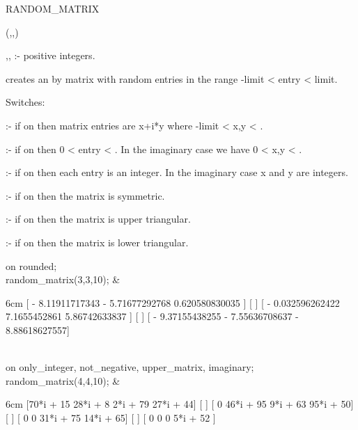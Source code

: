 \begin{Operator}[randommatrix]{RANDOM_MATRIX}

\begin{Syntax}
(,,)
\end{Syntax}
 
,, :- positive integers. 

 creates an  by  matrix with random
entries in the range -limit < entry < limit.


Switches:

    :- if on then matrix entries are x+i*y where -limit < x,y
                 < . 

 :- if on then 0 < entry < . In the imaginary 
                 case we have 0 < x,y < . 

 :- if on then each entry is an integer. In the imaginary 
		 case x and y are integers.

     :- if on then the matrix is symmetric. 

 :- if on then the matrix is upper triangular.

 :- if on then the matrix is lower triangular.



\begin{Examples}

on rounded; \\
random_matrix(3,3,10); &
\begin{multilineoutput}{6cm}
[ - 8.11911717343    - 5.71677292768   0.620580830035 ]
[                                                     ]
[ - 0.032596262422    7.1655452861     5.86742633837  ]
[                                                     ]
[ - 9.37155438255    - 7.55636708637   - 8.88618627557]
\end{multilineoutput}\\

on only_integer, not_negative, upper_matrix, imaginary; \\
random_matrix(4,4,10); &
\begin{multilineoutput}{6cm}
[70*i + 15  28*i + 8   2*i + 79   27*i + 44]
[                                          ]
[    0      46*i + 95  9*i + 63   95*i + 50]
[                                          ]
[    0          0      31*i + 75  14*i + 65]
[                                          ]
[    0          0          0      5*i + 52 ]
\end{multilineoutput}\\

\end{Examples}

\end{Operator}


